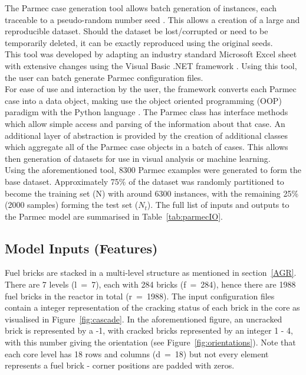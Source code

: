 The Parmec case generation tool allows batch generation of instances, each traceable to a pseudo-random number seed \cite{blum1982simple}. This allows a creation of a large and reproducible dataset. Should the dataset be lost/corrupted or need to be temporarily deleted, it can be exactly reproduced using the original seeds.
\\

\noindent
This tool was developed by adapting an industry standard Microsoft Excel sheet with extensive changes using the Visual Basic .NET framework \cite{grundgeiger2018programming}. Using this tool, the user can batch generate Parmec configuration files. 
\\

\noindent
For ease of use and interaction by the user, the framework converts each Parmec case into a data object, making use the object oriented programming (OOP) paradigm \cite{meyer1997object} with the Python language \cite{deitel2002python}. The Parmec class has interface methods which allow simple access and parsing of the information about that case. An additional layer of abstraction is provided by the creation of additional classes which aggregate all of the Parmec case objects in a batch of cases. This allows then generation of datasets for use in visual analysis or machine learning.
\\

\noindent
Using the aforementioned tool, 8300 Parmec examples were generated to form the base dataset. Approximately 75\% of the dataset was randomly partitioned to become the training set (N) with around 6300 instances, with the remaining 25\% (2000 samples) forming the test set ($N_t$). The full list of inputs and outputs to the Parmec model are summarised in Table~\ref{tab:parmecIO}.
 

\subsection{Model Inputs (Features)}

 Fuel bricks are stacked in a multi-level structure as mentioned in section~\ref{AGR}. There are 7 levels (l~=~7), each with 284 bricks (f~=~284), hence there are 1988 fuel bricks in the reactor in total (r~=~1988). The input configuration files contain a integer representation of the cracking status of each brick in the core as visualised in Figure~\ref{fig:cascade}. In the aforementioned figure, an uncracked brick is represented by a -1, with cracked bricks represented by an integer 1 - 4, with this number giving the orientation (see Figure~\ref{fig:orientations}). Note that each core level has 18 rows and columns (d~=~18) but not every element represents a fuel brick - corner positions are padded with zeros.
 \\
 
